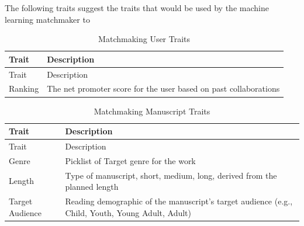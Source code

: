 \documentclass[10pt,openany]{book}
\begin{document}
The following traits suggest the traits that would be used by the
machine learning matchmaker to

\begin{longtable}[]{@{}ll@{}}
\caption{Matchmaking User Traits}\tabularnewline
\toprule
Trait & Description\tabularnewline
\midrule
\endfirsthead
\toprule
Trait & Description\tabularnewline
\midrule
\endhead
Ranking & The net promoter score for the user based on past
collaborations\tabularnewline
\bottomrule
\end{longtable}

\begin{longtable}[]{@{}ll@{}}
\caption{Matchmaking Manuscript Traits}\tabularnewline
\toprule
\begin{minipage}[b]{0.21\columnwidth}\raggedright
Trait\strut
\end{minipage} & \begin{minipage}[b]{0.73\columnwidth}\raggedright
Description\strut
\end{minipage}\tabularnewline
\midrule
\endfirsthead
\toprule
\begin{minipage}[b]{0.21\columnwidth}\raggedright
Trait\strut
\end{minipage} & \begin{minipage}[b]{0.73\columnwidth}\raggedright
Description\strut
\end{minipage}\tabularnewline
\midrule
\endhead
\begin{minipage}[t]{0.21\columnwidth}\raggedright
Genre\strut
\end{minipage} & \begin{minipage}[t]{0.73\columnwidth}\raggedright
Picklist of Target genre for the work\strut
\end{minipage}\tabularnewline
\begin{minipage}[t]{0.21\columnwidth}\raggedright
Length\strut
\end{minipage} & \begin{minipage}[t]{0.73\columnwidth}\raggedright
Type of manuscript, short, medium, long, derived from the planned
length\strut
\end{minipage}\tabularnewline
\begin{minipage}[t]{0.21\columnwidth}\raggedright
Target Audience\strut
\end{minipage} & \begin{minipage}[t]{0.73\columnwidth}\raggedright
Reading demographic of the manuscript's target audience (e.g., Child,
Youth, Young Adult, Adult)\strut
\end{minipage}\tabularnewline

\end{longtable}
\end{document}
